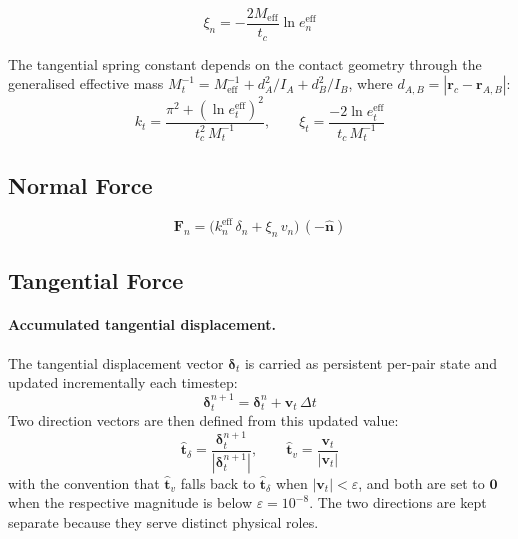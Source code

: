 \documentclass[12pt]{article}
\newcommand{\bs}[1]{\boldsymbol{#1}}
\begin{document}
\begin{equation}
  \xi_n = -\frac{2 M_\text{eff}}{t_c}\ln e_n^\text{eff}
\end{equation}

The tangential spring constant depends on the contact geometry through the
generalised effective mass $M_t^{-1} = M_\text{eff}^{-1}
+ d_A^2/I_A + d_B^2/I_B$, where $d_{A,B} = |\bs{r}_c - \bs{r}_{A,B}|$:
\begin{equation}
  k_t = \frac{\pi^2 + (\ln e_t^\text{eff})^2}{t_c^2\, M_t^{-1}}, \qquad
  \xi_t = \frac{-2\ln e_t^\text{eff}}{t_c\, M_t^{-1}}
\end{equation}

\subsection{Normal Force}

\begin{equation}
  \bs{F}_n = \bigl(k_n^\text{eff}\,\delta_n + \xi_n\, v_n\bigr)\,(-\hat{\bs{n}})
\end{equation}

\subsection{Tangential Force}

\paragraph{Accumulated tangential displacement.}
The tangential displacement vector $\bs{\delta}_t$ is carried as persistent
per-pair state and updated incrementally each timestep:
\begin{equation}
  \bs{\delta}_t^{n+1} = \bs{\delta}_t^n + \bs{v}_t\,\Delta t
\end{equation}
Two direction vectors are then defined from this updated value:
\begin{equation}
  \hat{\bs{t}}_\delta = \frac{\bs{\delta}_t^{n+1}}{|\bs{\delta}_t^{n+1}|},
  \qquad
  \hat{\bs{t}}_v = \frac{\bs{v}_t}{|\bs{v}_t|}
\end{equation}
with the convention that $\hat{\bs{t}}_v$ falls back to $\hat{\bs{t}}_\delta$
when $|\bs{v}_t| < \varepsilon$, and both are set to $\bs{0}$ when the
respective magnitude is below $\varepsilon = 10^{-8}$.  The two directions
are kept separate because they serve distinct physical roles.
\end{document}
